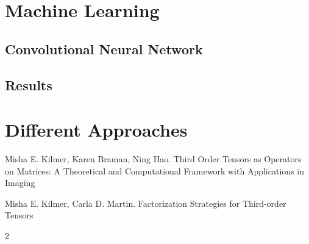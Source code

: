 \documentclass[twoside]{article}
\begin{document}
\begin{multicols}{2}
\section{Machine Learning}

\subsection{Convolutional Neural Network}

\subsection{Results}

\section{Different Approaches}





\begin{thebibliography}{99}

Misha E. Kilmer, Karen Braman, Ning Hao.
\newblock Third Order Tensors as Operators on Matrices: A
Theoretical and Computational Framework with
Applications in Imaging

Misha E. Kilmer, Carla D. Martin.
\newblock Factorization Strategies for Third-order Tensors

 
\end{thebibliography}


\end{multicols}{2}
\end{document}
